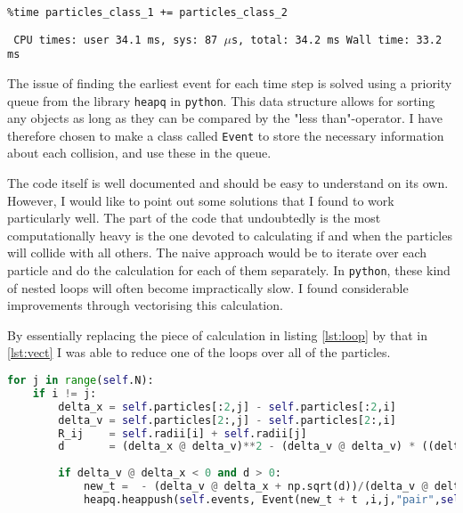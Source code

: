 \begin{lstlisting}
%time particles_class_1 += particles_class_2
\end{lstlisting}
\texttt{\small
CPU times: user 34.1 ms, sys: 87 $\mu$s, total: 34.2 ms
Wall time: 33.2 ms
}

The issue of finding the earliest event for each time step is solved using a priority queue from the library \texttt{heapq} in \texttt{python}. This data structure allows for sorting any objects as long as they can be compared by the "less than"-operator. I have therefore chosen to make a class called \texttt{Event} to store the necessary information about each collision, and use these in the queue.  

The code itself is well documented and should be easy to understand on its own. However, I would like to point out some solutions that I found to work particularly well. The part of the code that undoubtedly is the most computationally heavy is the one devoted to calculating if and when the particles will collide with all others. The naive approach would be to iterate over each particle and do the calculation for each of them separately. In \texttt{python}, these kind of nested loops will often become impractically slow. I found considerable improvements through vectorising this calculation. 

By essentially replacing the piece of calculation in listing \ref{lst:loop} by that in \ref{lst:vect} I was able to reduce one of the loops over all of the particles.

\begin{lstlisting}[language=Python,caption= Loop over all particles.,label={lst:loop}]
for j in range(self.N):
	if i != j:
		delta_x = self.particles[:2,j] - self.particles[:2,i]
		delta_v = self.particles[2:,j] - self.particles[2:,i]
		R_ij    = self.radii[i] + self.radii[j]
		d       = (delta_x @ delta_v)**2 - (delta_v @ delta_v) * ((delta_x @ delta_x) - R_ij**2)
		
		if delta_v @ delta_x < 0 and d > 0:
			new_t =  - (delta_v @ delta_x + np.sqrt(d))/(delta_v @ delta_v)
			heapq.heappush(self.events, Event(new_t + t ,i,j,"pair",self.count[i], self.count[j]))
\end{lstlisting}

